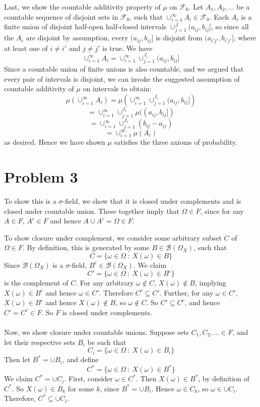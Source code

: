 \documentclass[10pt,letter]{article}
\begin{document}
Last, we show the countable additivity property of $\mu$ on $\mathcal{F}_0$. Let $A_1, A_2, ...$ be a countable sequence of disjoint sets in $\mathcal{F}_0$, such that $\cup_{i=1}^\infty A_i \in \mathcal{F}_0$. Each $A_i$ is a finite union of disjoint half-open half-closed intervals $\cup_{j=1}^J (a_{ij}, b_{ij}]$, so since all the $A_i$ are disjoint by assumption, every $(a_{ij}, b_{ij}]$ is disjoint from $(a_{i'j'}, b_{i'j'}]$, where at least one of $i\neq i'$ and $j \neq j'$ is true. We have
\[ \cup_{i=1}^\infty A_i = \cup_{i=1}^\infty\cup_{j=1}^{J_i} (a_{ij}, b_{ij}] \]
Since a countable union of finite unions is also countable, and we argued that every pair of intervals is disjoint, we can invoke the suggested assumption of countable additivity of $\mu$ on intervals to obtain:
\[ \mu\left(\cup_{i=1}^\infty A_i\right) = \mu\left(\cup_{i=1}^\infty\cup_{j=1}^{J_i} (a_{ij}, b_{ij}] \right) \]
\[ = \cup_{i=1}^\infty\cup_{j=1}^{J_i} \mu((a_{ij}, b_{ij}])\]
\[ = \cup_{i=1}^\infty\cup_{j=1}^{J_i} (b_{ij} - a_{ij}) \]
\[ = \cup_{i=1}^\infty \mu(A_i) \]
as desired. Hence we have shown $\mu$ satisfies the three axioms of probability.
\section*{Problem 3}
To show this is a $\sigma$-field, we show that it is closed under complements and is closed under countable union. These together imply that $\Omega \in F$, since for any $A \in F$, $A^c \in F$ and hence $A \cup A^c = \Omega \in F$.

To show closure under complement, we consider some arbitrary subset $C$ of $\Omega \in F$. By definition, this is generated by some $B \in \mathcal{B}(\Omega_X)$, such that
\[C = \{ \omega \in \Omega \ : \ X(\omega) \in B \} \]
Since $\mathcal{B}(\Omega_X)$ is a $\sigma$-field, $B^c \in \mathcal{B}(\Omega_X)$. We claim
\[C' = \{ \omega \in \Omega \ : \ X(\omega) \in B^c \} \]
is the complement of $C$. For any arbitrary $\omega \not \in C$, $X(\omega) \not \in B$, implying $X(\omega) \in B^c$ and hence $\omega \in C'$. Therefore $C^c \subseteq C'$. Further, for any $\omega \in C'$, $X(\omega) \in B^c$ and hence $X(\omega) \not \in B$, so $\omega \not \in C$.
So $C' \subseteq C^c$, and hence $C' = C^c \in F$. So $F$ is closed under complements.
\\\\
Now, we show closure under countable unions. Suppose sets $C_1, C_2, ... \in F$, and let their respective sets $B_i$ be such that
\[C_i = \{ \omega \in \Omega \ : \ X(\omega) \in B_i \} \]
Then let $B^* = \cup B_i$, and define
\[ C^* = \{ \omega \in \Omega \ : \ X(\omega) \in B^* \} \]
We claim $C^* = \cup C_i$. First, consider $\omega \in C^*$. Then $X(\omega) \in B^*$, by definition of $C^*$. So $X(\omega) \in B_k$ for some $k$, since $B^* = \cup B_i$. Hence $\omega \in C_k$, so $\omega \in \cup C_i$. Therefore, $C^* \subseteq \cup C_i$.
\end{document}
